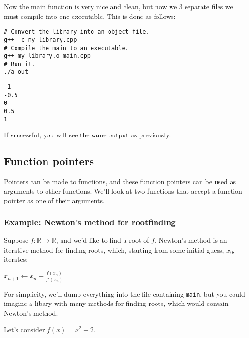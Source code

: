 \documentclass[11pt]{article}
\begin{document}
Now the main function is very nice and clean, but now we 3 separate files we 
must compile into one executable. This is done as follows:

\begin{verbatim}
# Convert the library into an object file.
g++ -c my_library.cpp
# Compile the main to an executable.
g++ my_library.o main.cpp
# Run it.
./a.out
\end{verbatim}

\begin{verbatim}
-1
-0.5
0
0.5
1
\end{verbatim}

If successful, you will see the same output \hyperref[sec:orgheadline41]{as previously}.

\subsection{Function pointers}
\label{sec:orgheadline48}

Pointers can be made to functions, and these function pointers can be used 
as arguments to other functions. We'll look at two functions that accept a 
function pointer as one of their arguments.

\subsubsection{Example: Newton's method for rootfinding}
\label{sec:orgheadline46}

Suppose \(f: \mathbb{R} \to \mathbb{R}\), and we'd like to find a root of \(f\). 
Newton's method is an iterative method for finding roots, which, starting 
from some initial guess, \(x_0\), iterates:

\(x_{n+1} \leftarrow x_n - \frac{f(x_n)}{f'(x_n)}\)

For simplicity, we'll dump everything into the file containing \texttt{main}, but
you could imagine a libary with many methods for finding roots, which would 
contain Newton's method.

Let's consider \(f(x) = x^2 - 2\).
\end{document}
